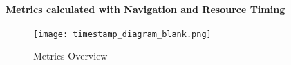 









\paragraph{Metrics calculated with Navigation and Resource Timing}




\begin{figure}[h!]
\begin{center}
\texttt{[image: timestamp\_diagram\_blank.png]}
\caption{Metrics Overview}
\label{img:latency}
\end{center}
\end{figure}






